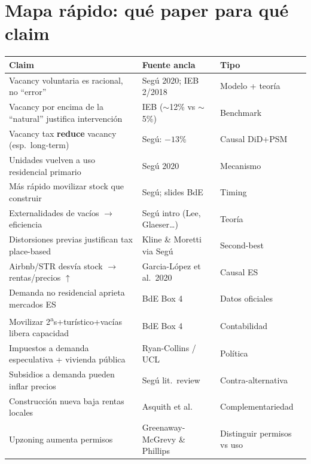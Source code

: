 \documentclass[11pt,a4paper]{report}
\begin{document}
\chapter{Mapa r\'apido: qu\'e paper para qu\'e claim}
\label{ch:mapa}

\begin{center}
\renewcommand{\arraystretch}{1.2}
\begin{longtable}{@{}p{5.2cm}p{4.2cm}p{3.5cm}@{}}
\toprule
\textbf{Claim} & \textbf{Fuente ancla} & \textbf{Tipo} \\
\midrule
\endhead
Vacancy voluntaria es racional, no ``error'' & Seg\'u 2020; IEB 2/2018 & Modelo + teor\'ia \\
Vacancy por encima de la ``natural'' justifica intervenci\'on & IEB ($\sim$12\% vs $\sim$5\%) & Benchmark \\
Vacancy tax \textbf{reduce} vacancy (esp.\ long-term) & Seg\'u: $-13\%$ & Causal DiD+PSM \\
Unidades vuelven a uso residencial primario & Seg\'u 2020 & Mecanismo \\
M\'as r\'apido movilizar stock que construir & Seg\'u; slides BdE & Timing \\
Externalidades de vac\'ios $\rightarrow$ eficiencia & Seg\'u intro (Lee, Glaeser\ldots) & Teor\'ia \\
Distorsiones previas justifican tax place-based & Kline \& Moretti via Seg\'u & Second-best \\
Airbnb/STR desv\'ia stock $\rightarrow$ rentas/precios $\uparrow$ & Garcia-L\'opez et al.\ 2020 & Causal ES \\
Demanda no residencial aprieta mercados ES & BdE Box 4 & Datos oficiales \\
Movilizar 2\textsuperscript{a}s+tur\'istico+vac\'ias libera capacidad & BdE Box 4 & Contabilidad \\
Impuestos a demanda especulativa + vivienda p\'ublica & Ryan-Collins / UCL & Pol\'itica \\
Subsidios a demanda pueden inflar precios & Seg\'u lit.\ review & Contra-alternativa \\
Construcci\'on nueva baja rentas locales & Asquith et al. & Complementariedad \\
Upzoning aumenta permisos & Greenaway-McGrevy \& Phillips & Distinguir permisos vs uso \\
\bottomrule
\end{longtable}
\end{center}

\end{document}
